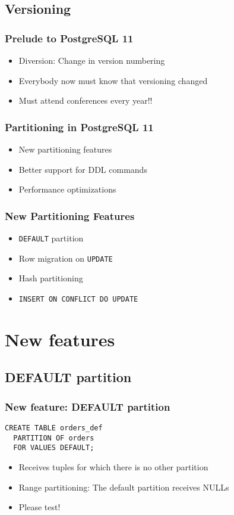 \subsection{Versioning}
\begin{frame}
  \frametitle{Prelude to PostgreSQL 11}

  \begin{itemize}
    \item Diversion: Change in version numbering
    \item Everybody now must know that versioning changed
    \item Must attend conferences every year!!
  \end{itemize}
\end{frame}

\begin{frame}
  \frametitle{Partitioning in PostgreSQL 11}

  \begin{itemize}
    \item New partitioning features
    \item Better support for DDL commands
    \item Performance optimizations
  \end{itemize}
\end{frame}

\begin{frame}
  \frametitle{New Partitioning Features}

  \begin{itemize}
    \item \texttt{DEFAULT} partition
    \item Row migration on \texttt{UPDATE}
    \item Hash partitioning
    \item \texttt{INSERT ON CONFLICT DO UPDATE}
  \end{itemize}
\end{frame}

\section{New features}
\subsection{DEFAULT partition}

\begin{frame}[fragile]
  \frametitle{New feature: DEFAULT partition}

\begin{lstlisting}
CREATE TABLE orders_def
  PARTITION OF orders
  FOR VALUES DEFAULT;
\end{lstlisting}

  \begin{itemize}
    \item Receives tuples for which there is no other partition
    \item Range partitioning: The default partition receives NULLs
    \item<2-> Please test!
  \end{itemize}
\end{frame}

